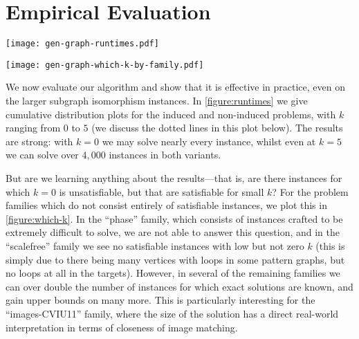 \documentclass[letterpaper]{article}
\theoremstyle{definition}
\begin{document}
\section{Empirical Evaluation}\label{section:evaluation}

\begin{figure*}[tb]
    \centering
    \texttt{[image: gen-graph-runtimes.pdf]}
    \caption{In the first two plots, the cumulative number of instances solved over time, for the
        induced and non-induced problems, with different values of $k$. We also show the results of
        iteratively decreasing $k$ until a solution is found, and in the induced case, the
        performance of two leading maximum common subgraph algorithms. In the third plot, results
        comparing our algorithm with iteratively decreasing $k$ to other approaches on maximum
        common induced subgraph instances.}\label{figure:runtimes}
\end{figure*}

\begin{figure*}[tb]
    \centering
    \texttt{[image: gen-graph-which-k-by-family.pdf]}
    \caption{The proportion of instances, in different families, which become satisfiable for
    increasing values of $k$. The larger instances are those where we can prove unsatisfiability for
    $k = 5$, whilst the gap between the top of the bar and the top of the graph is the fraction of
    instances where a timeout was reached for at least one value of $k$.}\label{figure:which-k}
\end{figure*}

We now evaluate our algorithm and show that it is effective in practice, even on the larger subgraph
isomorphism instances. In \cref{figure:runtimes} we give cumulative distribution plots for the
induced and non-induced problems, with $k$ ranging from $0$ to $5$ (we discuss the dotted lines in
this plot below). The results are strong: with $k = 0$ we may solve nearly every instance, whilst
even at $k = 5$ we can solve over $4,000$ instances in both variants.

But are we learning anything about the results---that is, are there instances for which $k = 0$ is
unsatisfiable, but that are satisfiable for small $k$? For the problem families which do not consist
entirely of satisfiable instances, we plot this in \cref{figure:which-k}. In the ``phase'' family,
which consists of instances crafted to be extremely difficult to solve, we are not able to answer
this question, and in the ``scalefree'' family we see no satisfiable instances with low but not zero
$k$ (this is simply due to there being many vertices with loops in some pattern graphs, but no loops
at all in the targets). However, in several of the remaining families we can over double the number
of instances for which exact solutions are known, and gain upper bounds on many more. This is
particularly interesting for the ``images-CVIU11'' family, where the size of the solution has a
direct real-world interpretation in terms of closeness of image matching.
\end{document}
